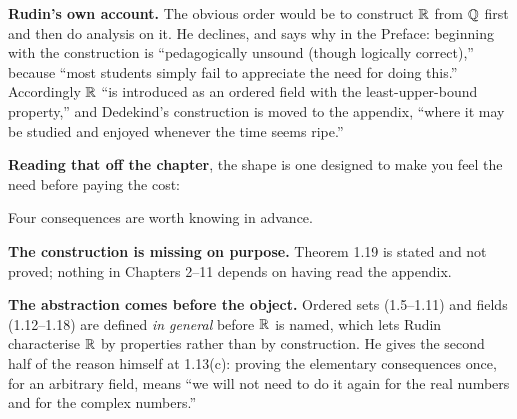 \begin{roadmap}
\textbf{Rudin's own account.} The obvious order would be to construct $\mathbb{R}$ from
$\mathbb{Q}$ first and then do analysis on it. He declines, and says why in the Preface:
beginning with the construction is ``pedagogically unsound (though logically
correct),'' because ``most students simply fail to appreciate the need for doing
this.'' Accordingly $\mathbb{R}$ ``is introduced as an ordered field with the
least-upper-bound property,'' and Dedekind's construction is moved to the
appendix, ``where it may be studied and enjoyed whenever the time seems ripe.''

\smallskip
\textbf{Reading that off the chapter}, the shape is one designed to make you
feel the need before paying the cost:

\medskip
\centering
{}

\medskip
\raggedright
Four consequences are worth knowing in advance.

\smallskip
\textbf{The construction is missing on purpose.} Theorem 1.19 is stated and not
proved; nothing in Chapters 2--11 depends on having read the appendix.

\smallskip
\textbf{The abstraction comes before the object.} Ordered sets (1.5--1.11) and
fields (1.12--1.18) are defined \emph{in general} before $\mathbb{R}$ is named, which
lets Rudin characterise $\mathbb{R}$ by properties rather than by construction. He gives
the second half of the reason himself at 1.13(c): proving the elementary
consequences once, for an arbitrary field, means ``we will not need to do it
again for the real numbers and for the complex numbers.''


\end{roadmap}
